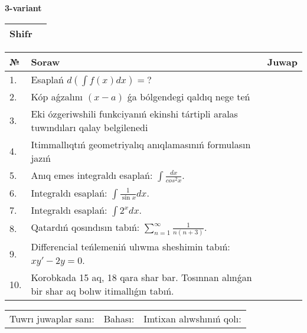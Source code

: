 \documentclass{article}
\begin{document}
  \egroup
  
  \newpage
  
  
  \textbf{3-variant}\\
  
  \bgroup
  \def\arraystretch{1.6} %
  
  \begin{tabular}{|m{5.7cm}|m{9.5cm}|}
  \hline
  Shifr & \\
  \hline
  \end{tabular}
  
  \vspace{1cm}
  
  \begin{tabular}{|m{0.7cm}|m{10cm}|m{4cm}|}
  \hline
  № & Soraw & Juwap \\
  \hline
  1. & Esaplań \(d\left( \int{f(x)dx} \right) = ?\) &  \\
  \hline
  2. & Kóp aǵzalını \((x - a)\) ǵa bólgendegi qaldıq nege teń &  \\
  \hline
  3. & Eki ózgeriwshili funkciyanıń ekinshi tártipli aralas tuwındıları qalay belgilenedi &  \\
  \hline
  4. & Itimmallıqtıń geometriyalıq anıqlamasınıń formulasın jazıń &  \\
  \hline
  5. & Anıq emes integraldı esaplań: \(\int\frac{dx}{cos^2 x}\). &  \\
  \hline
  6. & Integraldı esaplań: \(\int{\frac{1}{\sin x}dx}\). &  \\
  \hline
  7. & Integraldı esaplań: \(\int{2^{x}dx}\). &  \\
  \hline
  8. & Qatardıń qosındısın tabıń: \(\sum_{n = 1}^{\infty}\frac{1}{n(n + 3)}\). &  \\
  \hline
  9. & Differencial teńlemeniń ulıwma sheshimin tabıń: \(xy' - 2y = 0\). &  \\
  \hline
  10. & Korobkada 15 aq, 18 qara shar bar. Tosınnan alınǵan bir shar aq bolıw itimallıǵın tabıń. &  \\
  \hline
  \end{tabular}
  
  \vspace{1cm}
  
  \begin{tabular}{lll}
  Tuwrı juwaplar sanı: \underline{\hspace{1.5cm}} & 
  Bahası: \underline{\hspace{1.5cm}} & 
  Imtixan alıwshınıń qolı: \underline{\hspace{2cm}} \\
  \end{tabular}
  
\end{document}

